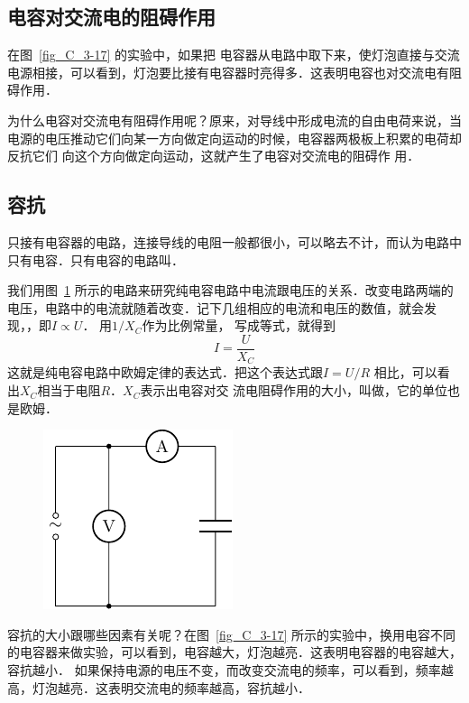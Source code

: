 \subsection{电容对交流电的阻碍作用}
在图~\ref{fig_C_3-17} 的实验中，如果把
电容器从电路中取下来，使灯泡直接与交流电源相接，可以看到，灯泡要比接有电容器时亮得多．这表明电容也对交流电有阻碍作用．

为什么电容对交流电有阻碍作用呢？原来，对导线中形成电流的自由电荷来说，当电源的电压推动它们向某一方向做定向运动的时候，电容器两极板上积累的电荷却反抗它们
向这个方向做定向运动，这就产生了电容对交流电的阻碍作
用．

\subsection{容抗}

只接有电容器的电路，连接导线的电阻一般都很小，可以略去不计，而认为电路中只有电容．只有电容的电路叫．


我们用图~\ref{fig_C_3-18} 所示的电路来研究纯电容电路中电流跟电压的关系．改变电路两端的电压，电路中的电流就随着改变．记下几组相应的电流和电压的数值，就会发现，，即$I\propto U$．
用$1/X_C$作为比例常量，
写成等式，就得到
\[I=\frac{U}{X_C}\]
这就是纯电容电路中欧姆定律的表达式．把这个表达式跟$I=U/R$
相比，可以看出$X_C$相当于电阻$R$．$X_C$表示出电容对交
流电阻碍作用的大小，叫做，它的单位也是欧姆．

\begin{figure}[htbp]
	\centering
	\includegraphics{fig/C/3-18.pdf}
	\caption{}\label{fig_C_3-18}
\end{figure}


容抗的大小跟哪些因素有关呢？在图~\ref{fig_C_3-17} 所示的实验中，换用电容不同的电容器来做实验，可以看到，电容越大，灯泡越亮．这表明电容器的电容越大，容抗越小．
如果保持电源的电压不变，而改变交流电的频率，可以看到，频率越高，灯泡越亮．这表明交流电的频率越高，容抗越小．

